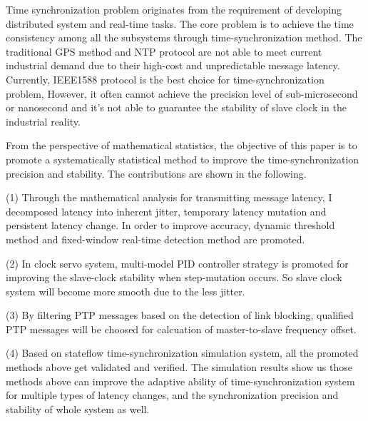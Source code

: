 \begin{englishabstract}

Time synchronization problem originates from the requirement of developing distributed system and real-time tasks. The core problem is to achieve the time consistency among all the subsystems through time-synchronization method. The traditional GPS method and NTP protocol are not able to meet current industrial demand due to their high-cost and unpredictable message latency. Currently, IEEE1588 protocol is the best choice for time-synchronization problem, However, it often cannot achieve the precision level of sub-microsecond or nanosecond and it's not able to guarantee the stability of slave clock in the industrial reality.

From the perspective of mathematical statistics, the objective of this paper is to promote a systematically statistical method to improve the time-synchronization precision and stability. The contributions are shown in the following.

(1) Through the mathematical analysis for transmitting message latency, I decomposed latency into inherent jitter, temporary latency mutation and persistent latency change. In order to improve accuracy, dynamic threshold method and fixed-window real-time detection method are promoted.

(2) In clock servo system, multi-model PID controller strategy is promoted for improving the slave-clock stability when step-mutation occurs. So slave clock system will become more smooth due to the less jitter.

(3) By filtering PTP messages based on the detection of link blocking, qualified PTP messages will be choosed for calcuation of master-to-slave frequency offset.


(4) Based on stateflow time-synchronization simulation system, all the promoted methods above get validated and verified. The simulation results show us those methods above can improve the adaptive ability of time-synchronization system for multiple types of latency changes, and the synchronization precision and stability of whole system as well.

\end{englishabstract}

